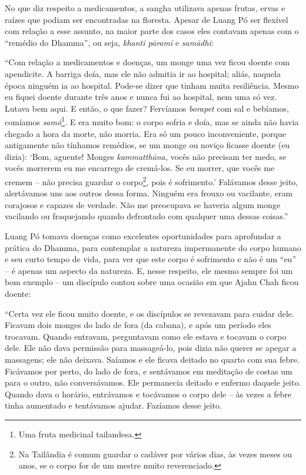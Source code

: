No que diz respeito a medicamentos, a sangha utilizava apenas frutas,
ervas e raízes que podiam ser encontradas na floresta. Apesar de Luang
Pó ser flexível com relação a esse assunto, na maior parte dos casos
eles contavam apenas com o ``remédio do Dhamma'', ou seja, \emph{khanti
pāramī} e \emph{samādhi}:

``Com relação a medicamentos e doenças, um monge uma vez ficou doente
com apendicite. A barriga doía, mas ele não admitia ir ao hospital;
aliás, naquela época ninguém ia ao hospital. Pode-se dizer que tinham
muita resiliência. Mesmo eu fiquei doente durante três anos e nunca fui
ao hospital, nem uma só vez. Lutava bem aqui. E então, o que fazer?
Fervíamos \emph{borapet} com sal e bebíamos, comíamos
\emph{samó}\footnote{Uma fruta medicinal tailandesa.}\emph{.} E era
muito bom: o corpo sofria e doía, mas se ainda não havia chegado a hora
da morte, não morria. Era só um pouco inconveniente, porque antigamente
não tínhamos remédios, se um monge ou noviço ficasse doente (eu dizia):
`Bom, aguente! Monges \emph{kammatthāna,} vocês não precisam ter medo,
se vocês morrerem eu me encarrego de cremá-los. Se eu morrer, que vocês
me cremem -- não precisa guardar o corpo\footnote{Na Tailândia é comum
  guardar o cadáver por vários dias, às vezes meses ou anos, se o corpo
  for de um mestre muito reverenciado.}, pois é sofrimento.' Falávamos
desse jeito, alertávamos uns aos outros dessa forma. Ninguém era frouxo
ou vacilante, eram corajosos e capazes de verdade. Não me preocupava se
haveria algum monge vacilando ou fraquejando quando defrontado com
qualquer uma dessas coisas.''

Luang Pó tomava doenças como excelentes oportunidades para aprofundar a
prática do Dhamma, para contemplar a natureza impermanente do corpo
humano e seu curto tempo de vida, para ver que este corpo é sofrimento e
não é um ``eu'' -- é apenas um aspecto da natureza. E, nesse respeito,
ele mesmo sempre foi um bom exemplo -- um discípulo contou sobre uma
ocasião em que Ajahn Chah ficou doente:

``Certa vez ele ficou muito doente, e os discípulos se revezavam para
cuidar dele. Ficavam dois monges do lado de fora (da cabana), e após um
período eles trocavam. Quando entravam, perguntavam como ele estava e
tocavam o corpo dele. Ele não dava permissão para massageá-lo, pois
dizia não querer se apegar a massagens; ele não deixava. Saíamos e ele
ficava deitado no quarto com sua febre. Ficávamos por perto, do lado de
fora, e sentávamos em meditação de costas um para o outro, não
conversávamos. Ele permanecia deitado e enfermo daquele jeito. Quando
dava o horário, entrávamos e tocávamos o corpo dele -- às vezes a febre
tinha aumentado e tentávamos ajudar. Fazíamos desse jeito.

